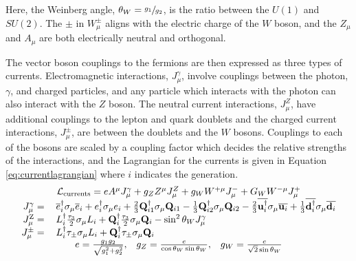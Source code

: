  Here, the Weinberg angle, $\theta_W=\sfrac{g_1}{g_2}$,
  is the ratio between the $U(1)$ and $SU(2)$.
 The $\pm$ in $W_\mu^\pm$ aligns with the electric charge of
  the $W$ boson, %
  and the $Z_\mu$ and $A_\mu$ are both electrically neutral and orthogonal.

 The vector boson couplings to the fermions
  are then expressed as three types of currents.
 Electromagnetic interactions, $J_\mu^{\gamma}$,
  involve couplings between the photon, $\gamma$,
  and charged particles,
  and any particle which interacts with the photon
  can also interact with the $Z$ boson. 
 The neutral current interactions, $J_\mu^{Z}$, have additional
  couplings to the lepton and quark doublets
  and the charged current interactions, $J_\mu^\pm$,
  are between the doublets and the $W$ bosons.
 Couplings to each of the bosons are scaled by
  a coupling factor which decides the relative
  strengths of the interactions,
  and the Lagrangian for the currents is given in Equation \ref{eq:currentlagrangian}
  where $i$ indicates the generation.
\begin{equation}\label{eq:currentlagrangian}
\begin{tabular}{rl}
\multicolumn{2}{c}{$ \mathcal{L}_\mathrm{currents} =
   eA^\mu J_\mu^{\gamma}
 + g_ZZ^\mu J_\mu^{Z} 
 + g_WW^{+\mu}J_\mu^-
 + G_WW^{-\mu}J_\mu^+
  $ }\\
 $ J_\mu^{\gamma} = $ & $ 
  \overline{e}_i^\dagger \sigma_\mu \overline{e}_i 
  + e_i^\dagger \sigma_\mu e_i 
  + \frac{2}{3} \mathbf{Q}^\dagger_{i1} \sigma_\mu \mathbf{Q}_{i1}
  - \frac{1}{3} \mathbf{Q}^\dagger_{i2} \sigma_\mu \mathbf{Q}_{i2}
  - \frac{2}{3} \overline{\mathbf{u}^\dagger_{i}} \sigma_\mu \overline{\mathbf{u}_{i}}
  + \frac{1}{3} \overline{\mathbf{d}^\dagger_{i}} \sigma_\mu \overline{\mathbf{d}_{i}} $
\\
 $ J_\mu^{\mathrm{Z}} = $ & $ 
  L_i^\dagger \frac{\tau_3}{2} \sigma_\mu L_i 
  + \mathbf{Q}^\dagger_{i} \frac{\tau_3}{2} \sigma_\mu \mathbf{Q}_{i}
  - \sin^2\theta_W J_\mu^{\gamma} $
\\
 $ J_\mu^{\pm} = $ & $ 
  L_i^\dagger \tau_\pm \sigma_\mu L_i 
  + \mathbf{Q}^\dagger_{i} \tau_\pm \sigma_\mu \mathbf{Q}_{i} $
\\
\multicolumn{2}{c}{ $
e   =  \frac{g_1 g_2}{\sqrt{g_1^2+g_2^2}},\;\;\;
g_Z =  \frac{e}{\cos \theta_W \sin \theta_W},\;\;\;
g_W =  \frac{e}{\sqrt{2} \sin \theta_W}
$ }
\end{tabular}
\end{equation}

